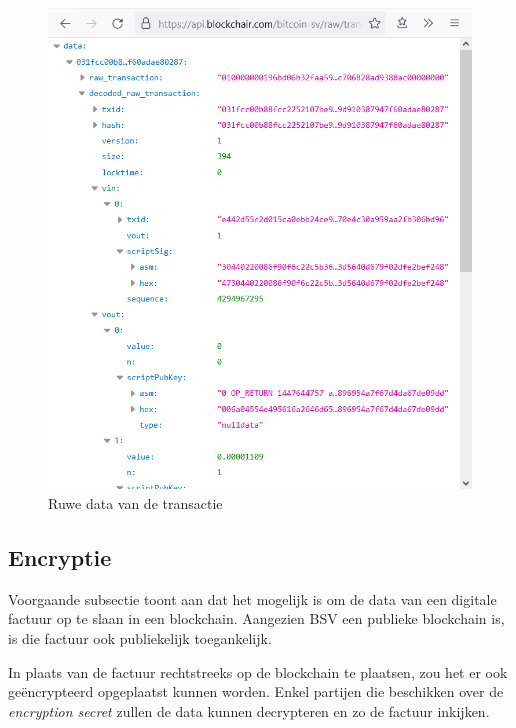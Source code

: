 \begin{figure}[H]
	\centering
	\includegraphics[width=0.8\linewidth]{img/proof-of-concept/ruwe-transactie.png}
	\caption{\label{fig:ruwe-transactie}Ruwe data van de transactie}
\end{figure}

\subsection{Encryptie}
\label{sub:encryptie}

Voorgaande subsectie toont aan dat het mogelijk is om de data van een digitale factuur op te slaan in een blockchain. Aangezien BSV een publieke blockchain is, is die factuur ook publiekelijk toegankelijk.

In plaats van de factuur rechtstreeks op de blockchain te plaatsen, zou het er ook geëncrypteerd opgeplaatst kunnen worden. Enkel partijen die beschikken over de \textit{encryption secret} zullen de data kunnen decrypteren en zo de factuur inkijken. 

